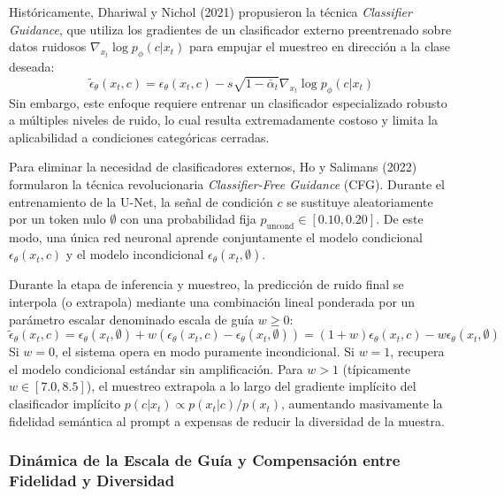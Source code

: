 Históricamente, Dhariwal y Nichol (2021) propusieron la técnica \textit{Classifier Guidance}, que utiliza los gradientes de un clasificador externo preentrenado sobre datos ruidosos $\nabla_{x_t} \log p_\phi(c|x_t)$ para empujar el muestreo en dirección a la clase deseada:
\begin{equation}
\tilde{\epsilon}_\theta(x_t, c) = \epsilon_\theta(x_t, c) - s \sqrt{1 - \bar{\alpha}_t} \nabla_{x_t} \log p_\phi(c|x_t)
\end{equation}
Sin embargo, este enfoque requiere entrenar un clasificador especializado robusto a múltiples niveles de ruido, lo cual resulta extremadamente costoso y limita la aplicabilidad a condiciones categóricas cerradas.

Para eliminar la necesidad de clasificadores externos, Ho y Salimans (2022) formularon la técnica revolucionaria \textit{Classifier-Free Guidance} (CFG). Durante el entrenamiento de la U-Net, la señal de condición $c$ se sustituye aleatoriamente por un token nulo $\emptyset$ con una probabilidad fija $p_{\mathrm{uncond}} \in [0.10, 0.20]$. De este modo, una única red neuronal aprende conjuntamente el modelo condicional $\epsilon_\theta(x_t, c)$ y el modelo incondicional $\epsilon_\theta(x_t, \emptyset)$.

Durante la etapa de inferencia y muestreo, la predicción de ruido final se interpola (o extrapola) mediante una combinación lineal ponderada por un parámetro escalar denominado escala de guía $w \ge 0$:
\begin{equation}
\tilde{\epsilon}_\theta(x_t, c) = \epsilon_\theta(x_t, \emptyset) + w \left( \epsilon_\theta(x_t, c) - \epsilon_\theta(x_t, \emptyset) \right) = (1 + w) \epsilon_\theta(x_t, c) - w \epsilon_\theta(x_t, \emptyset)
\end{equation}
Si $w=0$, el sistema opera en modo puramente incondicional. Si $w=1$, recupera el modelo condicional estándar sin amplificación. Para $w > 1$ (típicamente $w \in [7.0, 8.5]$), el muestreo extrapola a lo largo del gradiente implícito del clasificador implícito $p(c|x_t) \propto p(x_t|c)/p(x_t)$, aumentando masivamente la fidelidad semántica al prompt a expensas de reducir la diversidad de la muestra.

\subsubsection{Dinámica de la Escala de Guía y Compensación entre Fidelidad y Diversidad}

